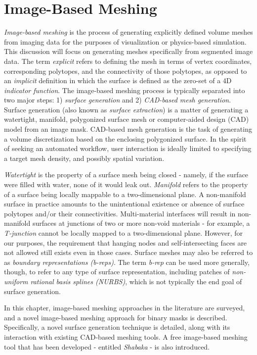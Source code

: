 \chapter{Image-Based Meshing}
\label{chap:3}

\textit{Image-based meshing} is the process of generating explicitly defined volume meshes from imaging data for the purposes of visualization or physics-based simulation. This discussion will focus on generating meshes specifically from segmented image data. The term \textit{explicit} refers to defining the mesh in terms of vertex coordinates, corresponding polytopes, and the connectivity of those polytopes, as opposed to an \textit{implicit} definition in which the surface is defined as the zero-set of a 4D \textit{indicator function}. The image-based meshing process is typically separated into two major steps: 1) \textit{surface generation} and 2) \textit{CAD-based mesh generation}. Surface generation (also known as \textit{surface extraction}) is a matter of generating a watertight, manifold, polygonized surface mesh or computer-aided design (CAD) model from an image mask. CAD-based mesh generation is the task of generating a volume discretization based on the enclosing polygonized surface. In the spirit of seeking an automated workflow, user interaction is ideally limited to specifying a target mesh density, and possibly spatial variation.

\textit{Watertight} is the property of a surface mesh being closed - namely, if the surface were filled with water, none of it would leak out. \textit{Manifold} refers to the property of a surface being locally mappable to a two-dimensional plane. A non-manifold surface in practice amounts to the unintentional existence or absence of surface polytopes and/or their connectivities. Multi-material interfaces will result in non-manifold surfaces at junctions of two or more non-void materials - for example, a \textit{T-junction} cannot be locally mapped to a two-dimensional plane. However, for our purposes, the requirement that hanging nodes and self-intersecting faces are not allowed still exists even in those cases. Surface meshes may also be referred to as \textit{boundary representations (b-reps)}. The term \textit{b-rep} can be used more generally, though, to refer to any type of surface representation, including patches of \textit{non-uniform rational basis splines (NURBS)}, which is not typically the end goal of surface generation. 

In this chapter, image-based meshing approaches in the literature are surveyed, and a novel image-based meshing approach for binary masks is described. Specifically, a novel surface generation technique is detailed, along with its interaction with existing CAD-based meshing tools. A free image-based meshing tool that has been developed - entitled \textit{Shabaka} - is also introduced.


